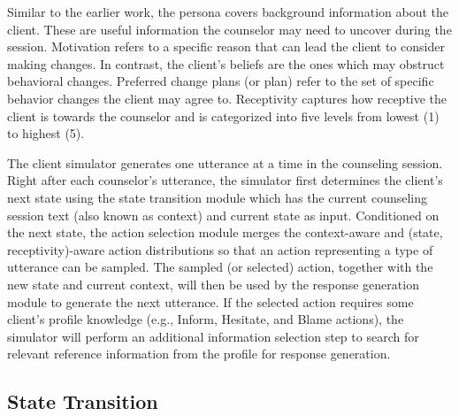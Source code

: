 Similar to the earlier work, the persona covers background information about the client. These are useful information the counselor may need to uncover during the session. Motivation refers to a specific reason that can lead the client to consider making changes. In contrast, the client's beliefs are the ones which may obstruct behavioral changes. Preferred change plans (or plan) refer to the set of specific behavior changes the client may agree to. Receptivity captures how receptive the client is towards the counselor and is categorized into five levels from lowest (1) to highest (5). 

The client simulator generates one utterance at a time in the counseling session.  Right after each counselor's utterance, the simulator first determines the client's next state using the state transition module which has the current counseling session text (also known as context) and current state as input.  Conditioned on the next state, the action selection module merges the context-aware and (state, receptivity)-aware action distributions so that an action representing a type of utterance can be sampled.  The sampled (or selected) action, together with the new state and current context, will then be used by the response generation module to generate the next utterance.  If the selected action requires some client's profile knowledge (e.g., Inform, Hesitate, and Blame actions), the simulator will perform an additional information selection step to search for relevant reference information from the profile for response generation.

\subsection{State Transition}
\label{sec:state transition}



